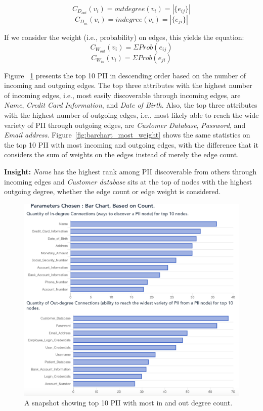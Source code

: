 \documentclass[conference]{IEEEtran}
\begin{document}
\begin{equation}
C_{D_{out}}(v_i) = outdegree(v_{i}) = |\{e_{ij}\}|
\end{equation}
\begin{equation}
C_{D_{in}}(v_i) = indegree(v_{i}) = |\{e_{ji}\}|
\end{equation}

If we consider the weight (i.e., probability) on edges, this yields the equation:
\begin{equation}
C_{W_{out}}(v_i) = \Sigma Prob(e_{ij})
\end{equation}
\begin{equation}
C_{W_{in}}(v_i) = \Sigma Prob(e_{ji})
\end{equation}

Figure ~\ref{fig:barchart_most_count} presents the top 10 PII in descending order based on the number of incoming and outgoing edges. The top three attributes with the highest number of incoming edges, i.e., most easily discoverable through incoming edges, are \textit{Name}, \textit{Credit Card Information}, and \textit{Date of Birth}. Also, the top three attributes with the highest number of outgoing edges, i.e., most likely able to reach the wide variety of PII through outgoing edges, are \textit{Customer Database}, \textit{Password}, and \textit{Email address}. Figure~\ref{fig:barchart_most_weight} shows the same statistics on the top 10 PII with most incoming and outgoing edges, with the difference that it considers the sum of weights on the edges instead of merely the edge count.

{\bf Insight:} \textit{Name} has the highest rank among PII discoverable from others through incoming edges and \textit{Customer database} sits at the top of nodes with the highest outgoing degree, whether the edge count or edge weight is considered.

\begin{figure}[ht!]
  \includegraphics[width=\linewidth]{barchart_most_count.png}
  \caption{A snapshot showing top 10 PII with most in and out degree count.}
  \label{fig:barchart_most_count}
\end{figure}
\end{document}
